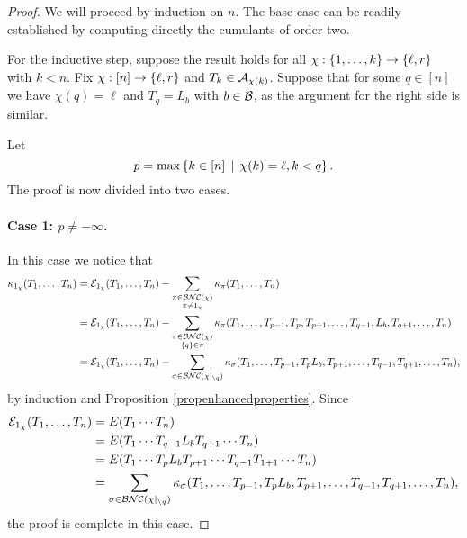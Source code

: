 		\begin{proof}
			We will proceed by induction on $n$.
			The base case can be readily established by computing directly the cumulants of order two.

			For the inductive step, suppose the result holds for all $\chi : \left\{1, \ldots, k\right\} \to \left\{\ell, r\right\}$ with $k < n$.
			Fix $\chi : [n] \to \left\{\ell, r\right\}$ and $T_k \in \mathcal{A}_{\chi(k)}$. 
			Suppose that for some $q \in [n]$ we have $\chi(q) = \ell$ and $T_q = L_b$ with $b \in \mathcal{B}$, as the argument for the right side is similar.

			Let
			\[
				p = \max\left\{k \in [n] \, \mid \, \chi(k) = \ell, k < q\right\}.
			\]
			The proof is now divided into two cases.

			\paragraph{Case 1: $p \neq -\infty$.}
			In this case we notice that
			\begin{align*}
				\kappa_{1_\chi}(T_1, \ldots, T_n)
				&= \mathcal{E}_{1_\chi}(T_1, \ldots, T_n) - \sum_{\substack{\pi \in \mathcal{BNC}(\chi)\\ \pi \neq 1_\chi}}\kappa_{\pi}(T_1, \ldots, T_n)
				\\
				&= \mathcal{E}_{1_\chi}(T_1, \ldots, T_n) - \sum_{\substack{\pi \in \mathcal{BNC}(\chi)\\ \left\{q\right\} \in \pi}}\kappa_{\pi}(T_1, \ldots, T_{p-1}, T_p, T_{p+1}, \ldots, T_{q-1}, L_b, T_{q+1}, \ldots, T_n)
				\\
				&= \mathcal{E}_{1_\chi}(T_1, \ldots, T_n) - \sum_{\sigma \in \mathcal{BNC}(\chi|_{\setminus q})}\kappa_{\sigma}(T_1, \ldots, T_{p-1}, T_p L_b, T_{p+1}, \ldots, T_{q-1}, T_{q+1}, \ldots, T_n),
			\end{align*}
			by induction and Proposition \ref{propenhancedproperties}.
			Since
			\begin{align*}
				\mathcal{E}_{1_\chi}(T_1, \ldots, T_n) &= E(T_1\cdots T_n)
				\\
				&= E(T_1 \cdots T_{q-1} L_b T_{q+1} \cdots T_n) \\
				&= E(T_1 \cdots T_p L_b T_{p+1} \cdots T_{q-1}T_{1+1}\cdots T_n) \\
				&=
				\sum_{\sigma \in \mathcal{BNC}(\chi|_{\setminus q})}\kappa_{\sigma}(T_1, \ldots, T_{p-1}, T_p L_b, T_{p+1}, \ldots, T_{q-1}, T_{q+1}, \ldots, T_n),
			\end{align*}
			the proof is complete in this case.




\end{proof}
